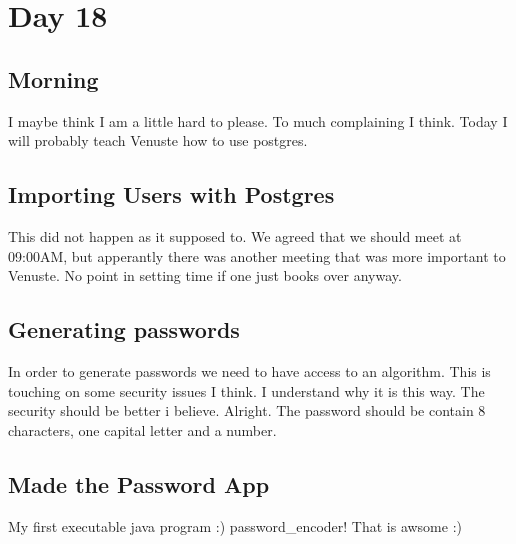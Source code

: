 \section{Day 18}

\subsection{Morning}
I maybe think I am a little hard to please.
To much complaining I think. 
Today I will probably teach Venuste how to use postgres.

\subsection{Importing Users with Postgres}
This did not happen as it supposed to. We agreed that we should meet at 09:00AM, but apperantly there was another meeting that was more important to Venuste. No point in setting time if one just books over anyway.

\subsection{Generating passwords}
In order to generate passwords we need to have access to an algorithm. 
This is touching on some security issues I think.
I understand why it is this way. The security should be better i believe.
Alright. The password should be contain 8 characters, one capital letter and a number.

\subsection{Made the Password App}
My first executable java program :) password\_encoder!
That is awsome :)